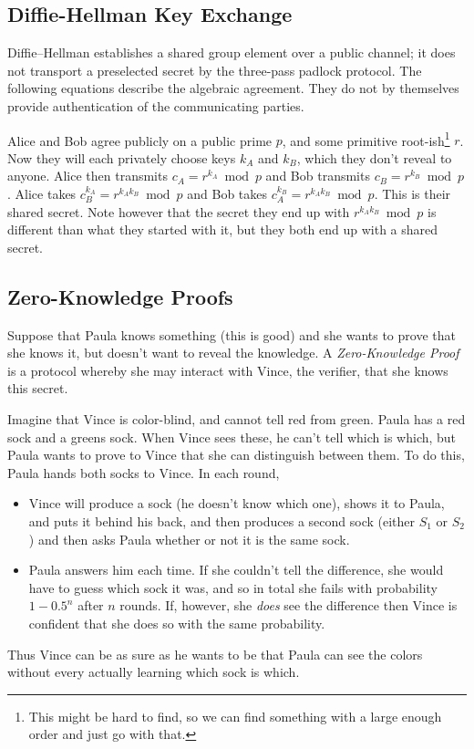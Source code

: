 \subsection{Diffie-Hellman Key Exchange}

Diffie--Hellman establishes a shared group element over a public channel;
it does not transport a preselected secret by the three-pass padlock protocol.
The following equations describe the algebraic agreement. They do not by themselves
provide authentication of the communicating parties.

Alice and Bob agree publicly on a public prime $p$, and some primitive root-ish\footnote{This might be hard to find, so we can find something with a large enough order and just go with that.} $r$. Now they will each privately choose keys $k_A$ and $k_B$, which they don't reveal to anyone. Alice then transmits $c_A = r^{k_A} \bmod p$ and Bob transmits $c_B = r^{k_B} \bmod p$. Alice takes $c_B^{k_A} = r^{k_Ak_B} \bmod p$ and Bob takes $c_A^{k_B} = r^{k_Ak_B} \bmod p$. This is their shared secret. Note however that the secret they end up with $r^{k_Ak_B} \bmod p$ is different than what they started with it, but they both end up with a shared secret.

\subsection{Zero-Knowledge Proofs}

Suppose that Paula knows something (this is good) and she wants to prove that she knows it, but doesn't want to reveal the knowledge. A \emph{Zero-Knowledge Proof} is a protocol whereby she may interact with Vince, the verifier, that she knows this secret.

\begin{example}
Imagine that Vince is color-blind, and cannot tell red from green. Paula has a red sock and a greens sock. When Vince sees these, he can't tell which is which, but Paula wants to prove to Vince that she can distinguish between them. To do this, Paula hands both socks to Vince. In each round, 
\begin{itemize}
\item Vince will produce a sock (he doesn't know which one), shows it to Paula, and puts it behind his back, and then produces a second sock (either $S_1$ or $S_2$) and then asks Paula whether or not it is the same sock. 
\item Paula answers him each time. If she couldn't tell the difference, she would have to guess which sock it was, and so in total she fails with probability $1-0.5^n$ after $n$ rounds. If, however, she \emph{does} see the difference then Vince is confident that she does so with the same probability.
\end{itemize}
Thus Vince can be as sure as he wants to be that Paula can see the colors without every actually learning which sock is which.
\end{example}

